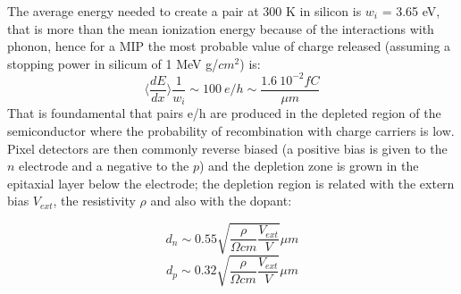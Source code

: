 The average energy needed to create a pair at 300 K in silicon is $w_i$ = 3.65 eV, that is more than the mean ionization energy because of the interactions with phonon, hence for a MIP the most probable value of charge released (assuming a stopping power in silicum of 1 MeV g/$cm^2$) is: 
\begin{equation}
   \langle \frac{dE}{dx}\rangle \frac{1}{w_i} \sim 100 \: e/h \sim \frac{1.6 \:10^{-2}fC}{\mu m}
\end{equation}
That is foundamental that pairs e/h are produced in the depleted region of the semiconductor where the probability of recombination with charge carriers is low.\\
Pixel detectors are then commonly reverse biased (a positive bias is given to the $n$ electrode and a negative to the $p$) and the depletion zone is grown in the epitaxial layer below the electrode; the depletion region is related with the extern bias $V_{ext}$, the resistivity $\rho$ and also with the dopant:
\begin{multicols}{2}
\begin{equation}
   d_{n} \sim 0.55 \sqrt{\frac{\rho}{\Omega cm}\frac{V_{ext}}{V}} \mu m 
\end{equation}\break
\begin{equation}
   d_{p} \sim 0.32 \sqrt{\frac{\rho}{\Omega cm}\frac{V_{ext}}{V}} \mu m
\end{equation}
\label{eq:deplation_d}
\end{multicols}

